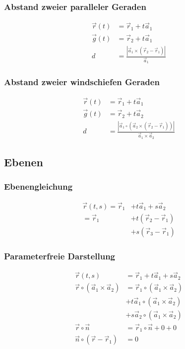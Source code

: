 \begin{multicols}{2}
\subsubsection*{Abstand zweier paralleler Geraden}
\begin{align*} 
\vec{r}(t) &=\vec{r}_1+t\vec{a}_1\\
\vec{g}(t) &=\vec{r}_2+t\vec{a}_1\\
d&=\frac{|\vec{a}_1\times\left(\vec{r}_2-\vec{r}_1\right)|}{\vec{a}_1}
\end{align*}
\vfill
\subsubsection*{Abstand zweier windschiefen Geraden}
\begin{align*} 
\vec{r}(t) &=\vec{r}_1+t\vec{a}_1\\
\vec{g}(t) &=\vec{r}_2+t\vec{a}_2\\
d&=\frac{|\vec{a}_1\circ\left(\vec{a}_2\times\left(\vec{r}_2-\vec{r}_1\right)\right)|}{\vec{a}_1\times\vec{a}_2}
\end{align*}
\vfill
\end{multicols}

\subsection{Ebenen}

\begin{multicols}{2}
\subsubsection*{Ebenengleichung}
\begin{align*} 
\vec{r}(t,s) =\vec{r}_1&+t\vec{a}_1+s\vec{a}_2\\
=\vec{r}_1 &+t(\vec{r}_2-\vec{r}_1)\\
	   &+s(\vec{r}_3-\vec{r}_1)
\end{align*}
\vfill
\subsubsection*{Parameterfreie Darstellung}
\begin{align*} 
\vec{r}(t,s) &=\vec{r}_1+t\vec{a}_1+s\vec{a}_2\\
\vec{r}\circ(\vec{a}_1\times\vec{a}_2)&=\vec{r}_1\circ(\vec{a}_1\times\vec{a}_2)\\
&+t\vec{a}_1\circ(\vec{a}_1\times\vec{a}_2)\\
&+s\vec{a}_2\circ(\vec{a}_1\times\vec{a}_2)\\
\vec{r}\circ\vec{n}&=\vec{r}_1\circ\vec{n}+0+0\\
\vec{n}\circ\left(\vec{r}-\vec{r}_1\right)&=0
\end{align*}
\vfill
\end{multicols}


